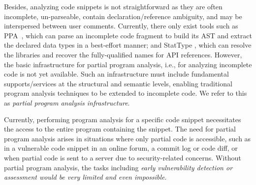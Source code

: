 Besides, analyzing code snippets is not straightforward as they are often incomplete, un-parseable, contain declaration/reference ambiguity, and may be interspersed between user comments. Currently, there only exist tools such as PPA~\cite{ppa08}, which can parse an incomplete code fragment to build its AST and extract the declared data types in a best-effort manner; and StatType \cite{icse18}, which can resolve the libraries and recover the fully-qualified names for API references. However, the basic infrastructure for partial program analysis, i.e., for analyzing incomplete code is not yet available. Such an infrastructure must include fundamental supports/services at the structural and semantic levels, enabling traditional program analysis techniques to be extended to incomplete code. We refer to this as \textit{partial program analysis infrastructure}.


Currently, performing program analysis for a specific code snippet
necessitates the access to the entire program containing the
snippet. The need for partial program analysis arises in situations
where only partial code is accessible, such as in a vulnerable code
snippet in an online forum, a commit log or code diff, or when partial
code is sent to a server due to security-related concerns. Without
partial program analysis, the tasks including {\em early vulnerability
detection or assessment would be very limited and even impossible}.



